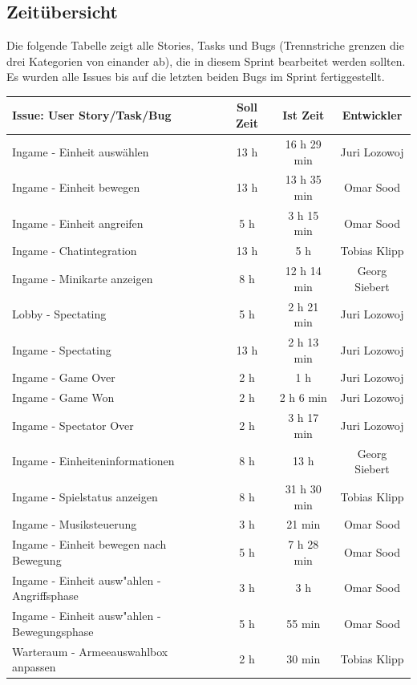 \documentclass[12pt, titlepage]{scrartcl}
\newcommand{\RN}[1]{%
	\textup{\uppercase\expandafter{\romannumeral#1}}%
}
\begin{document}
    	\subsection{Zeit\"ubersicht}
    		Die folgende Tabelle zeigt alle Stories, Tasks und Bugs (Trennstriche grenzen die drei Kategorien von einander ab), die in diesem Sprint bearbeitet werden sollten. Es wurden alle Issues bis auf die letzten beiden Bugs im Sprint \RN{6} fertiggestellt.
    		\begin{longtable}[H]{p{9cm} c c c }
    			\label{Time_2}
    			\textbf{Issue: User Story/Task/Bug} & \textbf{Soll Zeit} & \textbf{Ist Zeit} & \textbf{Entwickler} \\
    			\toprule
    			\endhead
    			Ingame - Einheit ausw\"ahlen & 13 h & 16 h 29 min & Juri Lozowoj \\
    			Ingame - Einheit bewegen & 13 h & 13 h 35 min & Omar Sood \\
    			Ingame - Einheit angreifen & 5 h & 3 h 15 min & Omar Sood \\
    			Ingame - Chatintegration & 13 h & 5 h & Tobias Klipp \\
    			Ingame - Minikarte anzeigen & 8 h & 12 h 14 min & Georg Siebert \\
    			Lobby - Spectating & 5 h & 2 h 21 min & Juri Lozowoj \\
    			Ingame - Spectating & 13 h & 2 h 13 min &  Juri Lozowoj \\
    			Ingame - Game Over & 2 h & 1 h  & Juri Lozowoj \\
    			Ingame - Game Won & 2 h & 2 h 6 min & Juri Lozowoj \\
    			Ingame - Spectator Over & 2 h & 3 h 17 min & Juri Lozowoj \\
    			Ingame - Einheiteninformationen & 8 h & 13 h & Georg Siebert \\
    			Ingame - Spielstatus anzeigen & 8 h & 31 h 30 min &  Tobias Klipp \\
    			Ingame - Musiksteuerung & 3 h & 21 min &  Omar Sood \\
    			Ingame - Einheit bewegen nach Bewegung & 5 h & 7 h 28 min & Omar Sood \\
    			Ingame - Einheit ausw"ahlen - Angriffsphase & 3 h & 3 h & Omar Sood \\
    			Ingame - Einheit ausw"ahlen - Bewegungsphase & 5 h & 55 min & Omar Sood \\
    			\midrule
    			Warteraum - Armeeauswahlbox anpassen & 2 h & 30 min & Tobias Klipp \\

\end{longtable}
\end{document}
